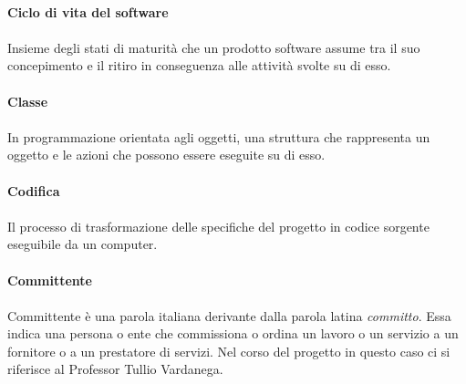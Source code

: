 \documentclass[10pt, a4paper]{article}
\begin{document}
\vspace{2em}
\paragraph{Ciclo di vita del software}\noindent\hrulefill\noindent\hrulefill
\paragraph{}Insieme degli stati di maturità che un prodotto software assume tra il suo concepimento e il ritiro in conseguenza alle
attività svolte su di esso.

\vspace{2em}
\paragraph{Classe}\noindent\hrulefill
\paragraph{}In programmazione orientata agli oggetti, una struttura che rappresenta un oggetto e le azioni che possono essere eseguite su di esso.


\vspace{2em}
\paragraph{Codifica}\noindent\hrulefill
\paragraph{}Il processo di trasformazione delle specifiche del progetto in codice sorgente eseguibile da un computer.


\vspace{2em}
\paragraph{Committente}\noindent\hrulefill
\paragraph{}Committente è una parola italiana derivante dalla parola latina \textit{committo}. Essa indica una persona o ente che commissiona o ordina un lavoro o un servizio a un fornitore o a un prestatore di
servizi. Nel corso del progetto in questo caso ci si riferisce al Professor Tullio Vardanega.

\vspace{2em}
\end{document}
